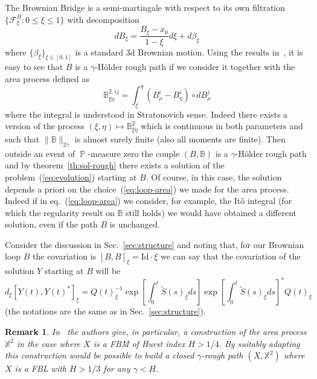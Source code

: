 \documentclass[a4paper,12pt,reqno]{amsart}
\DeclareMathOperator{\prob}{{\mathbb P}}
\newtheorem{remark}{Remark}
\newcommand{\CC}{\mathscr{C}}
\begin{document}
The Brownian Bridge is a semi-martingale with respect to its
own filtration $\{\mathcal{F}^B_\xi : 0 \le \xi \le 1\}$ with
decomposition
$$
dB_\xi = \frac{B_\xi - x_0}{1-\xi} d\xi + d\beta_\xi
$$
where $\{\beta_\xi\}_{\xi \in [0,1]}$ is a standard 3d Brownian motion. Using
the results in~\cite{Gubinelli}, it is easy to see that $B$ is a
$\gamma$-H\"older rough path if we consider it together with the area
process defined as
\begin{equation}
  \label{eq:loop-area}
\mathbb{B}^{2,ij}_{\xi\eta} = \int_\xi^\eta (B^i_\rho-B^i_\eta) \circ dB_\rho^j  \end{equation}
where the integral is understood in Stratonovich sense. Indeed there
exists a version of the process
$(\xi,\eta) \mapsto \mathbb{B}^2_{\xi\eta}$ which is continuous in
both parameters and such that $\|\mathbb{B}\|_{2\gamma}$ is almost
surely finite (also all moments are finite). Then outside an event of
$\prob$-measure zero the couple $(B,\mathbb{B})$ is a
$\gamma$-H\"older rough path and by theorem~\ref{th:sol-rough} there
exists a solution of the problem~(\ref{eq:evolution}) starting at
$B$. Of course, in this case, the solution depends a priori on the
choice~(\ref{eq:loop-area}) we made for the area process. Indeed if in
eq.~(\ref{eq:loop-area}) we consider, for example, the It\^o integral
(for which the regularity result on $\mathbb{B}$ still holds) we would
have obtained a different solution, even if the path $B$ is unchanged.



Consider the discussion in Sec.~\ref{sec:structure} and noting that,
for our Brownian loop $B$ the covariation is
$[B,B]_\xi =  \text{Id}\cdot \xi$ we can say
that the covariation of the solution $Y$ starting at $B$ will
be
$$
d_\xi [Y(t),Y(t)^*]_\xi = 
 Q(t)_\xi^{-1} \exp\left[\int_0^t \widetilde S(s)_\xi ds\right]
\exp\left[\int_0^t \widetilde S(s)_\xi ds\right]^* Q(t)_\xi 
$$
(the notations are the same as in Sec.~\ref{sec:structure}).




\begin{remark}
 In~\cite{coutin} the authors give, in particular, a construction of
 the \emph{area process} $\mathbb{X}^2$ in the case where $X$ is a FBM of Hurst index
 $H > 1/4$. By suitably adapting this construction would be possible
 to build a closed $\gamma$-rough path $(X,\mathbb{X}^2)$  where $X$
 is a FBL with $H > 1/3$ for any $\gamma < H$.     
\end{remark}
\end{document}
